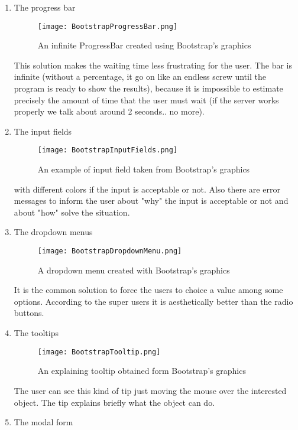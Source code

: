 \begin{enumerate}
\item The progress bar

\begin{figure}[H]
\centering
\texttt{[image: BootstrapProgressBar.png]} 
\caption{An infinite ProgressBar created using Bootstrap's graphics}
\end{figure}

This solution makes the waiting time less frustrating for the user. The bar is infinite (without a percentage, it go on like an endless screw until the program is ready to show the results), because it is impossible to estimate precisely the amount of time that the user must wait (if the server works properly we talk about around 2 seconds.. no more).

\item The input fields

\begin{figure}[H]
\centering
\texttt{[image: BootstrapInputFields.png]} 
\caption{An example of input field taken from Bootstrap's graphics}
\end{figure}

with different colors if the input is acceptable or not. Also there are error messages to inform the user about "why" the input is acceptable or not and about "how" solve the situation.


\item The dropdown menus

\begin{figure}[H]
\centering
\texttt{[image: BootstrapDropdownMenu.png]} 
\caption{A dropdown menu created with Bootstrap's graphics}
\end{figure}

It is the common solution to force the users to choice a value among some options. According to the super users it is aesthetically better than the radio buttons.

\item The tooltips

\begin{figure}[H]
\centering
\texttt{[image: BootstrapTooltip.png]} 
\caption{An explaining tooltip obtained form Bootstrap's graphics}
\end{figure}

The user can see this kind of tip just moving the mouse over the interested object. The tip explains briefly what the object can do.

\item The modal form


\end{enumerate}
